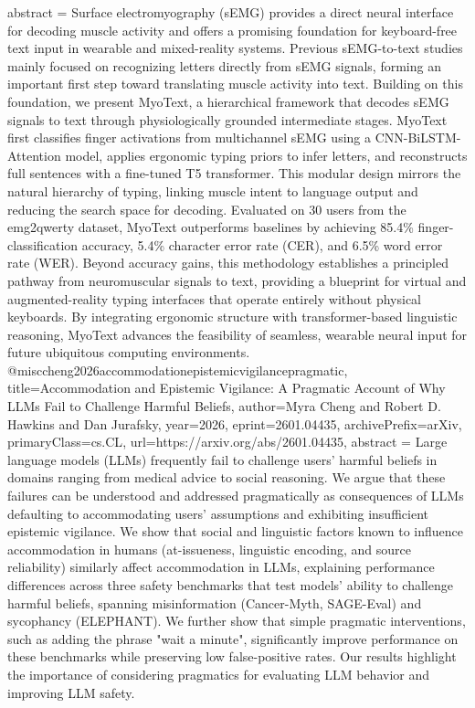 {      abstract = {Surface electromyography (sEMG) provides a direct neural interface for decoding muscle activity and offers a promising foundation for keyboard-free text input in wearable and mixed-reality systems. Previous sEMG-to-text studies mainly focused on recognizing letters directly from sEMG signals, forming an important first step toward translating muscle activity into text. Building on this foundation, we present MyoText, a hierarchical framework that decodes sEMG signals to text through physiologically grounded intermediate stages. MyoText first classifies finger activations from multichannel sEMG using a CNN-BiLSTM-Attention model, applies ergonomic typing priors to infer letters, and reconstructs full sentences with a fine-tuned T5 transformer. This modular design mirrors the natural hierarchy of typing, linking muscle intent to language output and reducing the search space for decoding. Evaluated on 30 users from the emg2qwerty dataset, MyoText outperforms baselines by achieving 85.4\% finger-classification accuracy, 5.4\% character error rate (CER), and 6.5\% word error rate (WER). Beyond accuracy gains, this methodology establishes a principled pathway from neuromuscular signals to text, providing a blueprint for virtual and augmented-reality typing interfaces that operate entirely without physical keyboards. By integrating ergonomic structure with transformer-based linguistic reasoning, MyoText advances the feasibility of seamless, wearable neural input for future ubiquitous computing environments.}
}@misc{cheng2026accommodationepistemicvigilancepragmatic,
      title={Accommodation and Epistemic Vigilance: A Pragmatic Account of Why LLMs Fail to Challenge Harmful Beliefs}, 
      author={Myra Cheng and Robert D. Hawkins and Dan Jurafsky},
      year={2026},
      eprint={2601.04435},
      archivePrefix={arXiv},
      primaryClass={cs.CL},
      url={https://arxiv.org/abs/2601.04435},
      abstract = {Large language models (LLMs) frequently fail to challenge users' harmful beliefs in domains ranging from medical advice to social reasoning. We argue that these failures can be understood and addressed pragmatically as consequences of LLMs defaulting to accommodating users' assumptions and exhibiting insufficient epistemic vigilance. We show that social and linguistic factors known to influence accommodation in humans (at-issueness, linguistic encoding, and source reliability) similarly affect accommodation in LLMs, explaining performance differences across three safety benchmarks that test models' ability to challenge harmful beliefs, spanning misinformation (Cancer-Myth, SAGE-Eval) and sycophancy (ELEPHANT). We further show that simple pragmatic interventions, such as adding the phrase "wait a minute", significantly improve performance on these benchmarks while preserving low false-positive rates. Our results highlight the importance of considering pragmatics for evaluating LLM behavior and improving LLM safety.}
}
